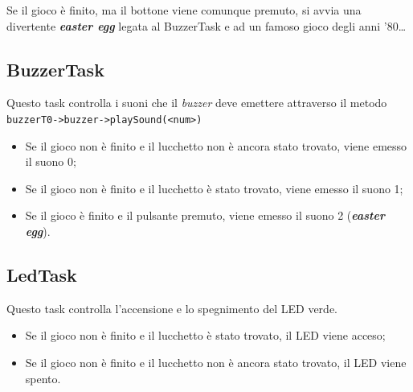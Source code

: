 Se il gioco è finito, ma il bottone viene comunque premuto, si avvia una divertente \textbf{\textit{easter egg}} legata al BuzzerTask e ad un famoso gioco degli anni '80\dots


\subsection{BuzzerTask}
Questo task controlla i suoni che il \textit{buzzer} deve emettere attraverso il metodo \texttt{buzzerT0->buzzer->playSound(<num>)}

\begin{itemize}
	\item Se il gioco non è finito e il lucchetto non è ancora stato trovato, viene emesso il suono 0;
	\item Se il gioco non è finito e il lucchetto è stato trovato, viene emesso il suono 1;
	\item Se il gioco è finito e il pulsante premuto, viene emesso il suono 2 (\textbf{\textit{easter egg}}).
\end{itemize}

\subsection{LedTask}
Questo task controlla l'accensione e lo spegnimento del LED verde.

\begin{itemize}
	\item Se il gioco non è finito e il lucchetto è stato trovato, il LED viene acceso;
	\item Se il gioco non è finito e il lucchetto non è ancora stato trovato, il LED viene spento.
\end{itemize}

